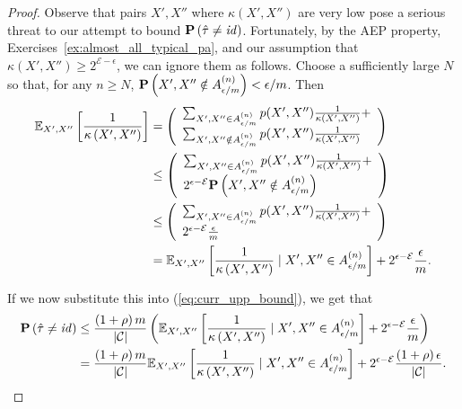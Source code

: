 \begin{proof}
Observe that pairs $X', X''$ where $\kappa\left(X', X''\right)$ are very low pose a serious threat to our attempt to bound $\mathbf{P}\left(\hat{\tau} \neq \mathit{id}\right)$. Fortunately, by the AEP property, Exercises~\ref{ex:almost_all_typical_pa}, and our assumption that $\kappa(X', X'') \geq 2^{\mathcal{E} - \epsilon}$, we can ignore them as follows. Choose a sufficiently large $N$ so that, for any $n \geq N$, $\mathbf{P}\left(X', X'' \notin A^{(n)}_{\epsilon/m}\right) < \epsilon / m$. Then
%
\begin{align}
\mathbb{E}_{X', X''}\left[\frac{1}{\kappa\left(X', X''\right)}\right]
&= \left(
\begin{array}{l}
\sum_{X', X'' \in A^{(n)}_{\epsilon/m}}p(X', X'')\frac{1}{\kappa\left(X', X''\right)} +\\ 
\sum_{X', X'' \notin A^{(n)}_{\epsilon/m}}p(X', X'')\frac{1}{\kappa\left(X', X''\right)}
\end{array}\right)\\
&\leq \left(
\begin{array}{l}
\sum_{X', X'' \in A^{(n)}_{\epsilon/m}}p(X', X'')\frac{1}{\kappa\left(X', X''\right)} +\\ 
2^{\epsilon - \mathcal{E}}\mathbf{P}\left(X', X'' \notin A^{(n)}_{\epsilon/m}\right)
\end{array}\right)\\
&\leq \left(
\begin{array}{l}
\sum_{X', X'' \in A^{(n)}_{\epsilon/m}}p(X', X'')\frac{1}{\kappa\left(X', X''\right)} +\\ 
2^{\epsilon - \mathcal{E}}\frac{\epsilon}{m}
\end{array}\right)\\
&= \mathbb{E}_{X', X''}\left[\frac{1}{\kappa\left(X', X''\right)} \mid X', X'' \in A^{(n)}_{\epsilon/m}\right] + 2^{\epsilon - \mathcal{E}}\frac{\epsilon}{m}.
\end{align}

If we now substitute this into (\ref{eq:curr_upp_bound}), we get that
%
\begin{align}
\mathbf{P}\left(\hat{\tau} \neq \mathit{id}\right) &\leq \frac{\left(1 + \rho\right)m}{\left|\mathcal{C}\right|}\left(\mathbb{E}_{X', X''}\left[\frac{1}{\kappa\left(X', X''\right)} \mid X', X'' \in A^{(n)}_{\epsilon/m}\right] + 2^{\epsilon - \mathcal{E}}\frac{\epsilon}{m}\right)\\
&= \frac{\left(1 + \rho\right)m}{\left|\mathcal{C}\right|}\mathbb{E}_{X', X''}\left[\frac{1}{\kappa\left(X', X''\right)} \mid X', X'' \in A^{(n)}_{\epsilon/m}\right] + 2^{\epsilon - \mathcal{E}}\frac{\left(1 + \rho\right)\epsilon}{\left|\mathcal{C}\right|}.\label{eq:semifinal_result}
\end{align}


\end{proof}

